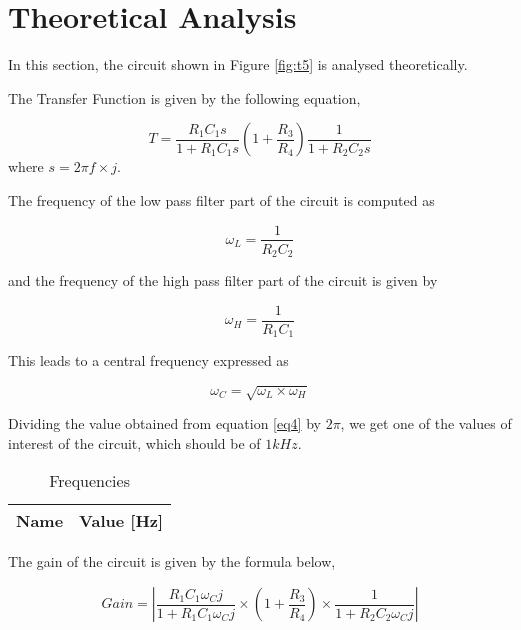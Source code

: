 \section{Theoretical Analysis}
\label{sec:analysis}

In this section, the circuit shown in Figure \ref{fig:t5} is analysed 
theoretically.

The Transfer Function is given by the following equation,

\begin{equation} \label{eq1}
T=\frac{R_1 C_1 s}{1+R_1 C_1 s}(1+ \frac{R_3}{R_4}) \frac{1}{1+R_2 C_2 s}
\end{equation}
where $s=2\pi f \times j$.

The frequency of the low pass filter part of the circuit is computed as

\begin{equation} \label{eq2}
\omega_L=\frac{1}{R_2 C_2}
\end{equation}

and the frequency of the high pass filter part of the circuit is given by

\begin{equation} \label{eq3}
\omega_H=\frac{1}{R_1 C_1}
\end{equation}

This leads to a central frequency expressed as

\begin{equation} \label{eq4}
\omega_C=\sqrt{\omega_L \times \omega_H}
\end{equation}

Dividing the value obtained from equation \ref{eq4} by $2\pi$, we get one of the values of interest of the circuit, which should be of $1 kHz$. \par

\begin{table}[h]
  \centering
  \begin{tabular}{|l|r|}
    \hline    
    {\bf Name} & {\bf Value [Hz]} \\ \hline
    
  \end{tabular}
  \caption{Frequencies}
  \label{tab:data}
\end{table}
\FloatBarrier


The gain of the circuit is given by the formula below,

\begin{equation} \label{eq5}
Gain = |\frac{R_1 C_1 \omega_C j}{1+R_1 C_1 \omega_C j} \times (1+\frac{R_3}{R_4}) \times \frac{1}{1+R_2 C_2 \omega_C j}|
\end{equation}

